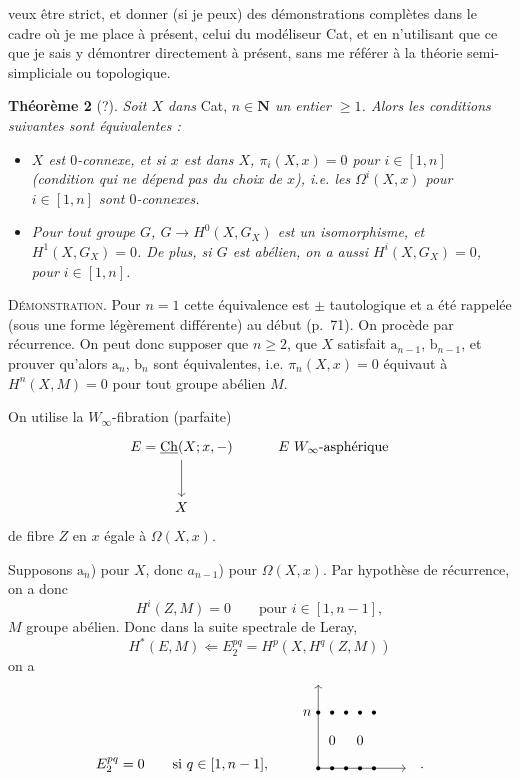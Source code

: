 \documentclass[11pt]{article}
\newcommand{\printedpage}[1]{\marginpar{\footnotesize p.~#1}}
\newcommand{\msp}[1]{\marginpar{\footnotesize [#1]}}
\newcommand{\Ch}{\underline{\mathrm{Ch}}}
\begin{document}
\printedpage{125}

\msp{page 188}
veux être strict, et donner (si je peux) des démonstrations complètes dans le cadre où je me place à présent, celui du modéliseur Cat, et en n'utilisant que ce que je sais y démontrer directement à présent, sans me référer à la théorie semi-simpliciale ou topologique.

\textbf{Théorème 2} (?). \textit{Soit $X$ dans} Cat, \textit{$n \in \mathbf{N}$ un entier $\geq 1$. Alors les conditions suivantes sont équivalentes :}

\begin{itemize}
\item[\textit{$a_n$)}] \textit{$X$ est $0$-connexe, et si $x$ est dans $X$, $\pi_i(X,x) = 0$ pour $i \in [1,n]$ (condition qui ne dépend pas du choix de $x$), i.e. les $\Omega^i(X,x)$ pour $i \in [1,n]$ sont $0$-connexes.}
\item[\textit{$b_n$)}] \textit{Pour tout groupe $G$, $G \longrightarrow H^0(X,G_X)$ est un isomorphisme, et $H^1(X,G_X) = 0$. De plus, si $G$ est abélien, on a aussi $H^i(X,G_X) = 0$, pour $i \in [1,n]$.}
\end{itemize}

\textsc{Démonstration}. Pour $n = 1$ cette équivalence est $\pm$ tautologique et a été rappelée (sous une forme légèrement différente) au début (p.~71). On procède par récurrence. On peut donc supposer que $n \geq 2$, que $X$ satisfait $\mathrm{a}_{n-1}$, $\mathrm{b}_{n-1}$, et prouver qu'alors $\mathrm{a}_n$, $\mathrm{b}_n$ sont équivalentes, i.e. $\pi_n(X,x) = 0$ équivaut à $H^n(X,M) = 0$ pour tout groupe abélien $M$.

\msp{page 189}
On utilise la $W_\infty$-fibration (parfaite)
\[
\begin{tikzcd}[row sep=large]
E = \Ch(X;x,-) \arrow[d] & E\ W_\infty\text{-asphérique} \\
X &
\end{tikzcd}
\]
de fibre $Z$ en $x$ égale à $\Omega(X,x)$.

Supposons $\mathrm{a}_n$) pour $X$, donc $a_{n-1}$) pour $\Omega(X,x)$. Par hypothèse de récurrence, on a donc
\[
H^i(Z,M) = 0 \qquad \text{pour } i \in [1,n-1],
\]
$M$ groupe abélien. Donc dans la suite spectrale de Leray,
\[
H^*(E,M) \Longleftarrow E_2^{pq} = H^p(X,H^q(Z,M))
\]
on a
\[
E_2^{pq} = 0 \qquad \text{si } q \in [1,n-1], \qquad
\begin{tikzpicture}[baseline=0]
\draw[->] (0,0) -- (2.2,0);
\draw[->] (0,0) -- (0,2.1);
\foreach \x in {0,0.35,0.7,1.05,1.4} {
  \fill (\x,0) circle (1.5pt);
  \fill (\x,1.4) circle (1.5pt);
}
\node[left] at (-0.05,1.4) {$n$};
\node at (0.35,0.7) {$0$};
\node at (1.05,0.7) {$0$};
\end{tikzpicture}
\quad .
\]
\end{document}
